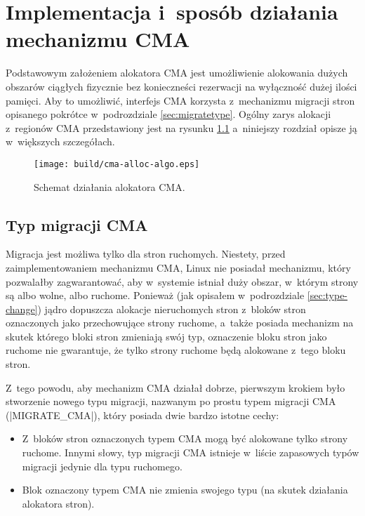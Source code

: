 \chapter{Implementacja i~sposób działania mechanizmu CMA}

Podstawowym założeniem alokatora CMA jest umożliwienie alokowania
dużych obszarów ciągłych fizycznie bez konieczneści rezerwacji na
wyłączność dużej ilości pamięci.  Aby to umożliwić, interfejs CMA
korzysta z~mechanizmu migracji stron opisanego pokrótce w~podrozdziale
\ref{sec:migratetype}.  Ogólny zarys alokacji z~regionów CMA
przedstawiony jest na rysunku \ref{fig:cma-alloc-algo} a~niniejszy
rozdział opisze ją w~większych szczegółach.

\begin{figure}[tbp]
  \texttt{[image: build/cma-alloc-algo.eps]}
  \caption{Schemat działania alokatora CMA.}
  \label{fig:cma-alloc-algo}
\end{figure}

\section{Typ migracji CMA}\label{sec:migrate-cma}

Migracja jest możliwa tylko dla stron ruchomych.  Niestety, przed
zaimplementowaniem mechanizmu CMA, Linux nie posiadał mechanizmu,
który pozwalałby zagwarantować, aby w~systemie istniał duży obszar,
w~którym strony są albo wolne, albo ruchome.  Ponieważ (jak opisałem
w~podrozdziale \ref{sec:type-change}) jądro dopuszcza alokacje
nieruchomych stron z~bloków stron oznaczonych jako przechowujące
strony ruchome, a~także posiada mechanizm na skutek którego bloki
stron zmieniają swój typ, oznaczenie bloku stron jako ruchome nie
gwarantuje, że tylko strony ruchome będą alokowane z~tego bloku stron.

Z~tego powodu, aby mechanizm CMA działał dobrze, pierwszym krokiem
było stworzenie nowego typu migracji, nazwanym po prostu typem
migracji CMA (\code|MIGRATE_CMA|), który posiada dwie bardzo istotne
cechy:

\begin{itemize}
\item Z~bloków stron oznaczonych typem CMA mogą być alokowane tylko
  strony ruchome.  Innymi słowy, typ migracji CMA istnieje w~liście
  zapasowych typów migracji jedynie dla typu ruchomego.
\item Blok oznaczony typem CMA nie zmienia swojego typu (na skutek
  działania alokatora stron).
\end{itemize}

